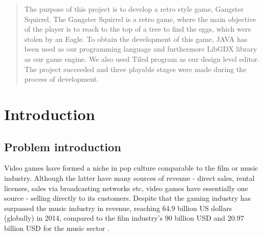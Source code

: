 \documentclass[12p]{article}
\begin{document}

\begin{abstract}
\thispagestyle{plain} %

\noindent The purpose of this project is to develop a retro style game, Gangster Squirrel. The Gangster Squirrel is a retro game, where the main objective of the player is to reach to the top of a tree to find the eggs, which were stolen by an Eagle. To obtain the development of this game, JAVA has been used as our programming language and furthermore LibGDX library as our game engine. We also used Tiled program as our design level editor. The project succeeded and three playable stages were made during the process of development. 

\end{abstract}

\newpage


\tableofcontents %
\thispagestyle{plain} %

\newpage %


\section{Introduction}

\subsection{Problem introduction} \label{ProblemIntroduction}

Video games have formed a niche in pop culture comparable to the film or music industry. Although the latter have many sources of revenue - direct sales, rental licenses, sales via broadcasting networks etc, video games have essentially one source - selling directly to its customers. Despite that the gaming industry has surpassed the music industry in revenue, reaching 64.9 billion US dollars (globally) in 2014, compared to the film industry’s 90 billion USD and 20.97 billion USD for the music sector \cite{UnderstandingVideoGames}.
\end{document}
